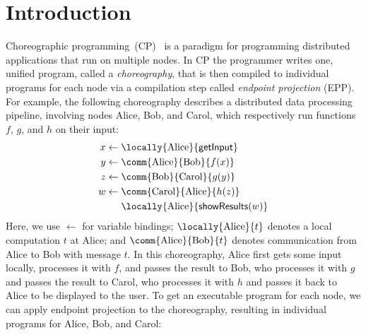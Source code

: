 \section{Introduction}

Choreographic programming~(CP)~\citep{montesi-2013, montesi-2023} is a paradigm for programming distributed applications that run on multiple nodes.
%
In CP the programmer writes one, unified program, called a \emph{choreography}, that is then compiled to individual programs for each node via a compilation step called \emph{endpoint projection} (EPP).
%
For example, the following choreography describes a distributed data processing pipeline, involving nodes Alice, Bob, and Carol, which respectively run functions $f$, $g$, and $h$ on their input:
%
\begin{equation*}
  \begin{split}
    x \leftarrow \; & \locally{\mathrm{Alice}}{\mathsf{getInput}} \\
    y \leftarrow \; & \comm{\mathrm{Alice}}{\mathrm{Bob}}{f(x)} \\
    z \leftarrow \; & \comm{\mathrm{Bob}}{\mathrm{Carol}}{g(y)} \\
    w \leftarrow \; & \comm{\mathrm{Carol}}{\mathrm{Alice}}{h(z)} \\
                    & \locally{\mathrm{Alice}}{\mathsf{showResults}(w)} \\
  \end{split}
\end{equation*}
%
Here, we use $\leftarrow$ for variable bindings;
%
$\locally{\mathrm{Alice}}{t}$ denotes a local computation $t$ at Alice;
%
and $\comm{\mathrm{Alice}}{\mathrm{Bob}}{t}$ denotes communication from Alice to Bob with message $t$.
%
In this choreography, Alice first gets some input locally, processes it with $f$, and passes the result to Bob, who processes it with $g$ and passes the result to Carol, who processes it with $h$ and passes it back to Alice to be displayed to the user.
%
To get an executable program for each node, we can apply endpoint projection to the choreography, resulting in individual programs for Alice, Bob, and Carol:
%
\hspace{-1cm}
